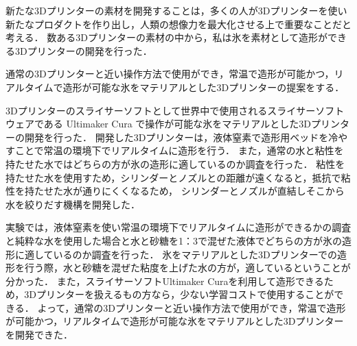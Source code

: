 新たな3Dプリンターの素材を開発することは，多くの人が3Dプリンターを使い新たなプロダクトを作り出し，人類の想像力を最大化させる上で重要なことだと考える．
数ある3Dプリンターの素材の中から，私は氷を素材として造形ができる3Dプリンターの開発を行った．

通常の3Dプリンターと近い操作方法で使用ができ，常温で造形が可能かつ，リアルタイムで造形が可能な氷をマテリアルとした3Dプリンターの提案をする．

3Dプリンターのスライサーソフトとして世界中で使用されるスライサーソフトウェアである Ultimaker Cura で操作が可能な氷をマテリアルとした3Dプリンターの開発を行った．
開発した3Dプリンターは，液体窒素で造形用ベッドを冷やすことで常温の環境下でリアルタイムに造形を行う．
また，通常の水と粘性を持たせた水ではどちらの方が氷の造形に適しているのか調査を行った．
粘性を持たせた水を使用すため，シリンダーとノズルとの距離が遠くなると，抵抗で粘性を持たせた水が通りにくくなるため，
シリンダーとノズルが直結しそこから水を絞りだす機構を開発した．

実験では，液体窒素を使い常温の環境下でリアルタイムに造形ができるかの調査と純粋な水を使用した場合と水と砂糖を1：3で混ぜた液体でどちらの方が氷の造形に適しているのか調査を行った．
氷をマテリアルとした3Dプリンターでの造形を行う際，水と砂糖を混ぜた粘度を上げた水の方が，適しているということが分かった．
また，スライサーソフトUltimaker Curaを利用して造形できるため，3Dプリンターを扱えるもの方なら，少ない学習コストで使用することができる．
よって，通常の3Dプリンターと近い操作方法で使用ができ，常温で造形が可能かつ，リアルタイムで造形が可能な氷をマテリアルとした3Dプリンターを開発できた．
